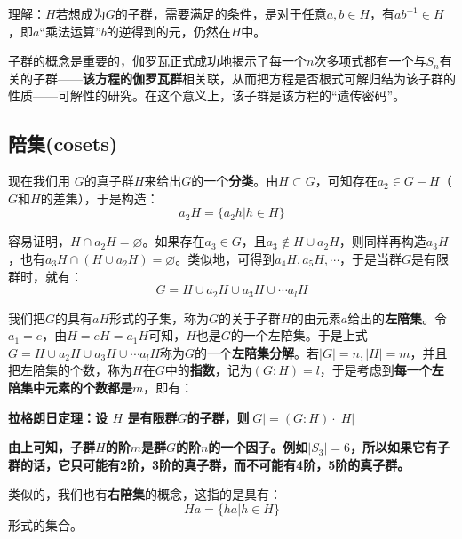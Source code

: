 \documentclass[12pt]{article}
\begin{document}
\begin{framed}
\small{
理解：$H$若想成为$G$的子群，需要满足的条件，是对于任意$a,b \in H$，有$ab^{-1} \in H$，即$a$“乘法运算”$b$的逆得到的元，仍然在$H$中。
}
\end{framed}

子群的概念是重要的，伽罗瓦正式成功地揭示了每一个$n$次多项式都有一个与$S_n$有关的子群——\textbf{该方程的伽罗瓦群}相关联，从而把方程是否根式可解归结为该子群的性质——可解性的研究。在这个意义上，该子群是该方程的“遗传密码”。

\subsection{陪集(cosets)}
现在我们用 $G$的真子群$H$来给出$G$的一个\textbf{分类}。由$H \subset G$，可知存在$a_2 \in G - H$（$G$和$H$的差集），于是构造：
$$
a_2H = \{a_2h | h \in H\}
$$

容易证明，$H \cap a_2H = \varnothing$。如果存在$a_3 \in G$，且$a_3 \notin H\cup a_2H$，则同样再构造$a_3H$，也有$a_3H \cap (H \cup a_2H) = \varnothing$。类似地，可得到$a_4H, a_5H, \cdots$，于是当群$G$是有限群时，就有：
$$
G = H \cup a_2H \cup a_3H \cup \cdots a_lH
$$

我们把$G$的具有$aH$形式的子集，称为$G$的关于子群$H$的由元素$a$给出的\textbf{左陪集}。令$a_1 = e$，由$H = eH = a_1H$可知，$H$也是$G$的一个左陪集。于是上式$G = H \cup a_2H \cup a_3H \cup \cdots a_lH$称为$G$的一个\textbf{左陪集分解}。若$|G| = n, |H| = m$，并且把左陪集的个数，称为$H$在$G$中的\textbf{指数}，记为$(G:H) = l$，于是考虑到\textbf{每一个左陪集中元素的个数都是$m$}，即有：
\begin{mdframed}[
linecolor=black!40,outerlinewidth=1pt,roundcorner=.5em,innertopmargin=1ex,innerbottommargin=.5\baselineskip,innerrightmargin=1em,innerleftmargin=1em,backgroundcolor=gray!5,
]
\textbf{
拉格朗日定理：设 $H$ 是有限群$G$的子群，则$|G| = (G:H)\cdot |H|$
}
\end{mdframed}

\textbf{由上可知，子群$H$的阶$m$是群$G$的阶$n$的一个因子。例如$|S_3| = 6$，所以如果它有子群的话，它只可能有2阶，3阶的真子群，而不可能有4阶，5阶的真子群。}

类似的，我们也有\textbf{右陪集}的概念，这指的是具有：
$$
Ha = \{ha | h \in H\}
$$
形式的集合。
\end{document}
